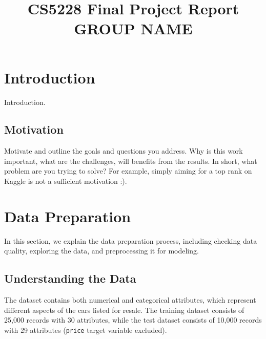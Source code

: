 \documentclass[conference]{IEEEtran}
\begin{document}
\title{CS5228 Final Project Report\\
GROUP NAME}

\author{
\and
{}
\IEEEauthorblockA{
 \\
}
\and
{}
\IEEEauthorblockA{
 \\
}
}

\maketitle

\begin{abstract}
    
\end{abstract}
\section{Introduction}
\label{sec:introduction}
Introduction.
\subsection{Motivation}
Motivate and outline the goals and questions you address. Why is this work important, what are the challenges, will benefits from the results. In short, what problem are you trying to solve? For example, simply aiming for a top rank on Kaggle is not a sufficient motivation :).

\section{Data Preparation}
\label{sec:data_preparation}
In this section, we explain the data preparation process, including checking data quality, exploring the data, and preprocessing it for modeling.

\subsection{Understanding the Data}
The dataset contains both numerical and categorical attributes, which represent different aspects of the cars listed for resale. 
The training dataset consists of 25,000 records with 30 attributes, while the test dataset consists of 10,000 records with 29 attributes (\texttt{price} target variable excluded).
\end{document}
